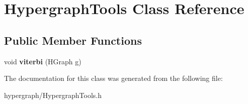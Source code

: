 \hypertarget{classHypergraphTools}{
\section{HypergraphTools Class Reference}
\label{classHypergraphTools}
}
\subsection*{Public Member Functions}
\begin{DoxyCompactItemize}
\item 
\hypertarget{classHypergraphTools_a188643770705ed9482616956e22ebfd4}{
void {\bfseries viterbi} (HGraph g)}
\label{classHypergraphTools_a188643770705ed9482616956e22ebfd4}

\end{DoxyCompactItemize}


The documentation for this class was generated from the following file:\begin{DoxyCompactItemize}
\item 
hypergraph/HypergraphTools.h\end{DoxyCompactItemize}
